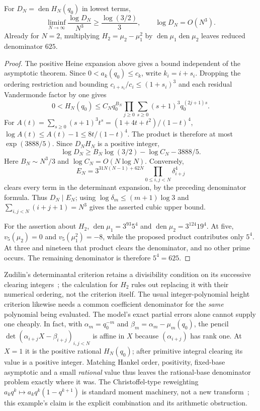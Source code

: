 \documentclass[11pt]{article}
\begin{document}
\begin{remark}
\label{long1049:prop:calibrated-height}
For $D_N=\operatorname{den}H_N(q_0)$ in lowest terms,
\[
 \liminf_{N\to\infty}\frac{\log D_N}{N^3}
       \ge\frac{\log(3/2)}3,
 \qquad \log D_N=O(N^3).
\]
Already for $N=2$, multiplying $H_2=\mu_2-\mu_1^2$ by
$\operatorname{den}\mu_1\operatorname{den}\mu_2$ leaves reduced
denominator $625$.
\end{remark}

\begin{proof}
The positive Heine expansion above gives a bound independent of the
asymptotic theorem.  Since $0<a_k(q_0)\le c_k$, write $k_i=i+s_i$.
Dropping the ordering restriction and bounding
$c_{i+s_i}/c_i\le(1+s_i)^3$ and each residual Vandermonde factor by
one gives
\[
 0<H_N(q_0)\le C_Nq_0^{B_N}
   \prod_{j\ge0}\sum_{s\ge0}(s+1)^3q_0^{(2j+1)s}.
\]
For $A(t)=\sum_{s\ge0}(s+1)^3t^s=(1+4t+t^2)/(1-t)^4$,
$\log A(t)\le A(t)-1\le8t/(1-t)^4$.  The product is therefore at
most $\exp(3888/5)$.  Since $D_NH_N$ is a positive integer,
\[
 \log D_N\ge B_N\log(3/2)-\log C_N-3888/5.
\]
Here $B_N\sim N^3/3$ and $\log C_N=O(N\log N)$.
Conversely,
\[
 E_N=3^{31N(N-1)+62N}\prod_{0\le i,j<N}\delta_{i+j}^{4}
\]
clears every term in the determinant expansion, by the preceding
denominator formula.  Thus $D_N\mid E_N$; using
$\log\delta_m\le(m+1)\log3$ and
$\sum_{i,j<N}(i+j+1)=N^3$ gives the asserted cubic upper bound.

For the assertion about $H_2$,
$\operatorname{den}\mu_1=3^{93}5^4$ and
$\operatorname{den}\mu_2=3^{124}19^4$.
At five, $v_5(\mu_2)=0$ and $v_5(\mu_1^2)=-8$,
while the proposed product contributes only $5^4$.
At three and nineteen that product clears the denominator, and no
other prime occurs.  The remaining denominator is therefore $5^4=625$.
\end{proof}

Zudilin's determinantal criterion retains a divisibility condition on
its successive clearing integers~\cite[Props.~1--2]{zudilin2017detv2};
the calculation for $H_2$ rules out replacing it with their numerical
ordering, not the criterion itself.  The usual integer-polynomial
height criterion likewise needs a common coefficient denominator for the
\emph{same} polynomial being evaluated.  The model's exact partial
errors alone cannot supply one cheaply.  In fact, with
$\alpha_m=q_0^{-m}$ and $\beta_m=\alpha_m-\mu_m(q_0)$, the pencil
$\det(\alpha_{i+j}X-\beta_{i+j})_{i,j<N}$ is affine in $X$ because
$(\alpha_{i+j})$ has rank one.  At $X=1$ it is the positive rational
$H_N(q_0)$; after primitive integral clearing its value is a positive
integer.  Matching Hankel order, positivity, fixed-base asymptotic and
a small \emph{rational} value thus leaves the rational-base denominator
problem exactly where it was.  The Christoffel-type reweighting
$a_kq^k\mapsto a_kq^k(1-q^{k+1})$ is standard moment machinery, not a
new transform~\cite[Intro., (3)--(4)]{kozhanvaktnas2024}; this example's claim is
the explicit combination and its arithmetic obstruction.
\end{document}
